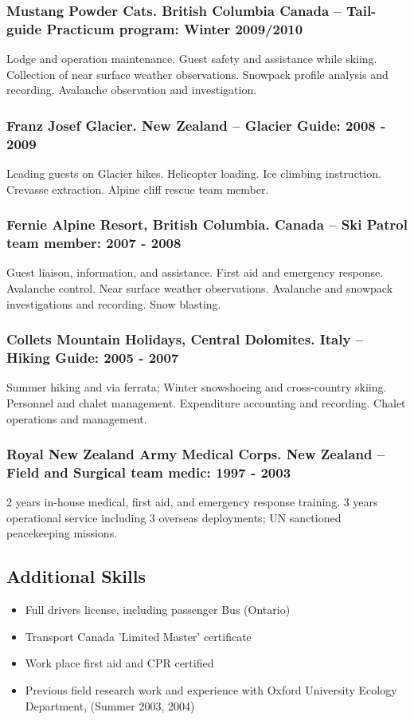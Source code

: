 \documentclass[]{article}
\begin{document}
\subsubsection*{Mustang Powder Cats. British Columbia Canada – Tail-guide Practicum program: Winter 2009/2010}
Lodge and operation maintenance. Guest safety and assistance while skiing. Collection of near surface weather observations. Snowpack profile analysis and recording. Avalanche observation and investigation. 
 \subsubsection*{Franz Josef Glacier. New Zealand – Glacier Guide: 2008 - 2009}
Leading guests on Glacier hikes. Helicopter loading. Ice climbing instruction. Crevasse extraction. Alpine
cliff rescue team member.
\subsubsection*{Fernie Alpine Resort, British Columbia. Canada – Ski Patrol team member: 2007 - 2008}
Guest liaison, information, and assistance. First aid and emergency response. Avalanche control. Near surface weather observations. Avalanche and snowpack investigations and recording. Snow blasting.
\subsubsection*{Collets Mountain Holidays, Central Dolomites. Italy – Hiking Guide: 2005 - 2007}
Summer hiking and via ferrata; Winter snowshoeing and cross-country skiing. Personnel and chalet management. Expenditure accounting and recording. Chalet operations and management.
\subsubsection*{Royal New Zealand Army Medical Corps. New Zealand – Field and Surgical team medic: 1997 - 2003}
2 years in-house medical, first aid, and emergency response training. 3 years operational service including 3 overseas deployments; UN sanctioned peacekeeping missions.

\subsection*{Additional Skills}
\begin{itemize}
\item Full drivers license, including passenger Bus (Ontario)
\item Transport Canada 'Limited Master' certificate
\item Work place first aid and CPR certified
\item Previous field research work and experience with Oxford University Ecology Department, (Summer 2003, 2004)
\end{itemize}
\end{document}
